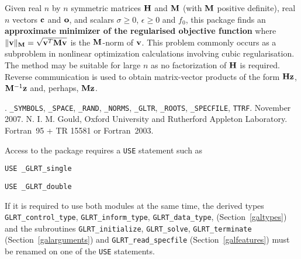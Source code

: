 \documentclass{galahad}
\newcommand{\packagename}{GL\-RT}
\newcommand{\fullpackagename}{\libraryname\_\packagename}
\begin{document}
\galheader


\galsummary
Given real $n$ by $n$ symmetric matrices ${\mathbf{H}}$ and ${\mathbf{M}}$
(with ${\mathbf{M}}$ positive definite), real
$n$ vectors ${\mathbf{c}}$ and ${\mathbf{o}}$, and scalars $\sigma\geq 0$, $\epsilon\geq 0$
and $f_0$, this package finds an
{\bf approximate minimizer of the regularised objective function}
where $\|  {\mathbf{v}} \|_{{\mathbf{M}}} = \sqrt{{\mathbf{v}}^T {\mathbf{M}} {\mathbf{v}}}$ is
the ${\mathbf{M}}$-norm of ${\mathbf{v}}$.
This problem commonly occurs as a subproblem in nonlinear
optimization calculations involving cubic regularisation.
The method may be suitable for large $n$ as no factorization of ${\mathbf{H}}$ is
required. Reverse communication is used to obtain
matrix-vector products of the form ${\mathbf{H}} {\mathbf{z}}$, ${\mathbf{M}}^{-1} {\mathbf{z}}$
and, perhaps, ${\mathbf{M}} {\mathbf{z}}$.



\galattributes
\galversions{\tt  \fullpackagename\_single, \fullpackagename\_double}.
\galuses
{\tt \libraryname\_SY\-M\-BOLS},
{\tt \libraryname\_SPACE}, {\tt \libraryname\_\-RAND},
{\tt \libraryname\_\-NORMS}, {\tt \libraryname\_\-GLTR},
{\tt \libraryname\_ROOTS}, {\tt \libraryname\_SPECFILE},
{\tt *TTRF}.
\galdate November 2007.
\galorigin N. I. M. Gould, Oxford University and Rutherford Appleton Laboratory.
\gallanguage Fortran~95 + TR 15581 or Fortran~2003.


\galhowto

Access to the package requires a {\tt USE} statement such as

\medskip{}

\hskip0.5in {\tt USE \fullpackagename\_single}

\medskip{}

\hskip0.5in {\tt USE  \fullpackagename\_double}

\medskip

\noindent
If it is required to use both modules at the same time, the derived types
{\tt \packagename\_control\_type}, {\tt \packagename\_inform\_type},
{\tt \packagename\_data\_type},
(Section~\ref{galtypes})
and the subroutines
{\tt \packagename\_initialize},
{\tt \packagename\_solve}, {\tt \packagename\_terminate}
(Section~\ref{galarguments})
and
{\tt \packagename\_read\_specfile}
(Section~\ref{galfeatures})
must be renamed on one of the {\tt USE} statements.
\end{document}
